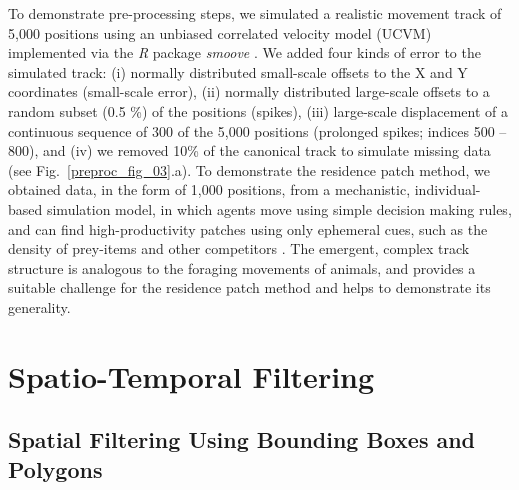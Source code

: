 To demonstrate pre-processing steps, we simulated a realistic movement track of 5,000 positions using an unbiased correlated velocity model (UCVM) implemented via the \textit{R} package \textit{smoove} \citep[][see Fig.~\ref{preproc_fig_03}.a]{gurarie2017}.
We added four kinds of error to the simulated track: (i) normally distributed small-scale offsets to the X and Y coordinates (small-scale error), (ii) normally distributed large-scale offsets to a random subset (0.5 \%) of the positions (spikes), (iii) large-scale displacement of a continuous sequence of 300 of the 5,000 positions (prolonged spikes; indices 500 -- 800), and (iv) we removed 10\% of the canonical track to simulate missing data (see Fig.~\ref{preproc_fig_03}.a).
To demonstrate the residence patch method, we obtained data, in the form of 1,000 positions, from a mechanistic, individual-based simulation model, in which agents move using simple decision making rules, and can find high-productivity patches using only ephemeral cues, such as the density of prey-items and other competitors \citep{gupte2021a, netz2022a}.
The emergent, complex track structure is analogous to the foraging movements of animals, and provides a suitable challenge for the residence patch method and helps to demonstrate its generality.

\section*{Spatio-Temporal Filtering}

\subsection*{Spatial Filtering Using Bounding Boxes and Polygons}

